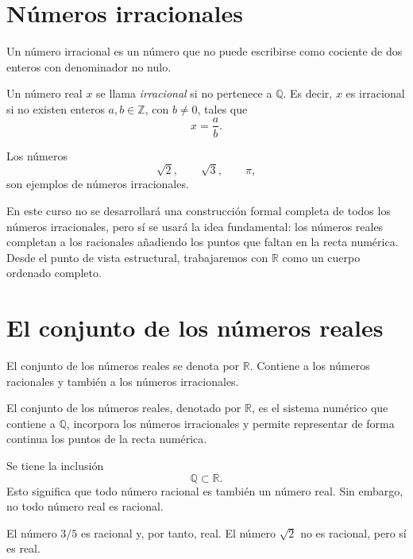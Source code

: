 \section{N\'umeros irracionales}

Un n\'umero irracional es un n\'umero que no puede escribirse como cociente de dos enteros con denominador no nulo.

\begin{definicion}
Un n\'umero real \(x\) se llama \emph{irracional} si no pertenece a \(\mathbb{Q}\). Es decir, \(x\) es irracional si no existen enteros \(a,b\in\mathbb{Z}\), con \(b\neq 0\), tales que
\[
  x=\frac{a}{b}.
\]
\end{definicion}

\begin{ejemplo}
Los n\'umeros
\[
  \sqrt{2},\qquad \sqrt{3},\qquad \pi,
\]
son ejemplos de n\'umeros irracionales.
\end{ejemplo}

En este curso no se desarrollar\'a una construcci\'on formal completa de todos los n\'umeros irracionales, pero s\'i se usar\'a la idea fundamental: los n\'umeros reales completan a los racionales a\~nadiendo los puntos que faltan en la recta num\'erica. Desde el punto de vista estructural, trabajaremos con \(\mathbb{R}\) como un cuerpo ordenado completo.

\section{El conjunto de los n\'umeros reales}

El conjunto de los n\'umeros reales se denota por \(\mathbb{R}\). Contiene a los n\'umeros racionales y tambi\'en a los n\'umeros irracionales.

\begin{definicion}
El conjunto de los n\'umeros reales, denotado por \(\mathbb{R}\), es el sistema num\'erico que contiene a \(\mathbb{Q}\), incorpora los n\'umeros irracionales y permite representar de forma continua los puntos de la recta num\'erica.
\end{definicion}

Se tiene la inclusi\'on
\[
  \mathbb{Q}\subset \mathbb{R}.
\]
Esto significa que todo n\'umero racional es tambi\'en un n\'umero real. Sin embargo, no todo n\'umero real es racional.

\begin{ejemplo}
El n\'umero \(3/5\) es racional y, por tanto, real. El n\'umero \(\sqrt{2}\) no es racional, pero s\'i es real.
\end{ejemplo}

